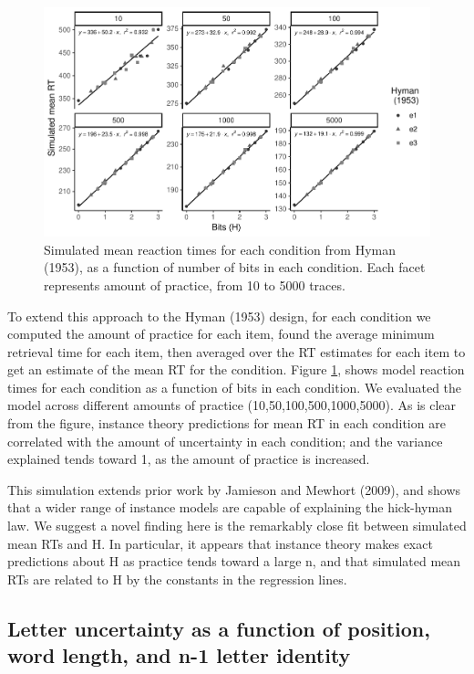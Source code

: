 \documentclass[,man,floatsintext]{apa6}
\begin{document}
\begin{figure}
\centering
\includegraphics{figures/Hyman_figure.pdf}
\caption{\label{fig:figureHyman}Simulated mean reaction times for each condition from Hyman (1953), as a function of number of bits in each condition. Each facet represents amount of practice, from 10 to 5000 traces.}
\end{figure}



To extend this approach to the Hyman (1953) design, for each condition we computed the amount of practice for each item, found the average minimum retrieval time for each item, then averaged over the RT estimates for each item to get an estimate of the mean RT for the condition. Figure \ref{fig:figureHyman}, shows model reaction times for each condition as a function of bits in each condition. We evaluated the model across different amounts of practice (10,50,100,500,1000,5000). As is clear from the figure, instance theory predictions for mean RT in each condition are correlated with the amount of uncertainty in each condition; and the variance explained tends toward 1, as the amount of practice is increased.

This simulation extends prior work by Jamieson and Mewhort (2009), and shows that a wider range of instance models are capable of explaining the hick-hyman law. We suggest a novel finding here is the remarkably close fit between simulated mean RTs and H. In particular, it appears that instance theory makes exact predictions about H as practice tends toward a large n, and that simulated mean RTs are related to H by the constants in the regression lines.

\hypertarget{letter-uncertainty-as-a-function-of-position-word-length-and-n-1-letter-identity}{%
\subsection{Letter uncertainty as a function of position, word length, and n-1 letter identity}\label{letter-uncertainty-as-a-function-of-position-word-length-and-n-1-letter-identity}}
\end{document}
